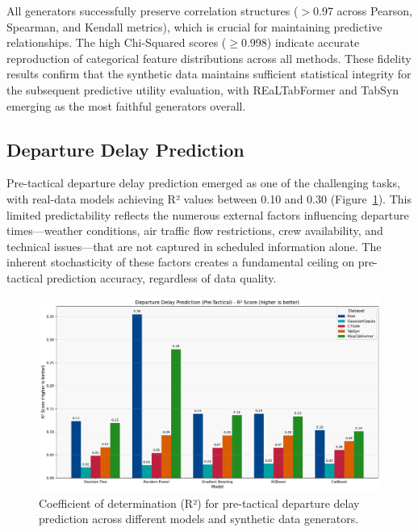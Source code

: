 \documentclass[conference]{IEEEtran}
\begin{document}
All generators successfully preserve correlation structures ($>$0.97 across Pearson, Spearman, and Kendall metrics), which is crucial for maintaining predictive relationships. The high Chi-Squared scores ($\geq$0.998) indicate accurate reproduction of categorical feature distributions across all methods. These fidelity results confirm that the synthetic data maintains sufficient statistical integrity for the subsequent predictive utility evaluation, with REaLTabFormer and TabSyn emerging as the most faithful generators overall.

\subsection{Departure Delay Prediction}

Pre-tactical departure delay prediction emerged as one of the challenging tasks, with real-data models achieving R² values between 0.10 and 0.30 (Figure~\ref{fig:departure_r2}). This limited predictability reflects the numerous external factors influencing departure times—weather conditions, air traffic flow restrictions, crew availability, and technical issues—that are not captured in scheduled information alone. The inherent stochasticity of these factors creates a fundamental ceiling on pre-tactical prediction accuracy, regardless of data quality.

\begin{figure}[htbp]
    \centering
    \includegraphics[width=\linewidth]{plots/departure_delay_min_pre-tactical/departure_delay_min_pre-tactical_r2.pdf}
    \caption{Coefficient of determination (R²) for pre-tactical departure delay prediction across different models and synthetic data generators.}
    \label{fig:departure_r2}
\end{figure}
\end{document}
